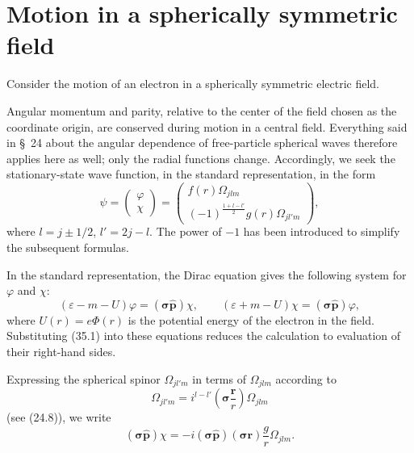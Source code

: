 
\section{Motion in a spherically symmetric field}

Consider the motion of an electron in a spherically symmetric electric field.

Angular momentum and parity, relative to the center of the field chosen as the coordinate origin, are conserved during motion in a central field. Everything said in \S~24 about the angular dependence of free-particle spherical waves therefore applies here as well; only the radial functions change. Accordingly, we seek the stationary-state wave function, in the standard representation, in the form
\begin{equation}
\psi=\begin{pmatrix}\varphi\\ \chi\end{pmatrix}
=\begin{pmatrix}
f(r)\Omega_{jlm}\\
(-1)^{\frac{1+l-l'}2}g(r)\Omega_{jl'm}
\end{pmatrix},
\tag{35.1}
\end{equation}
where $l=j\pm1/2$, $l'=2j-l$. The power of $-1$ has been introduced to simplify the subsequent formulas.

In the standard representation, the Dirac equation gives the following system for $\varphi$ and $\chi$:
\begin{equation}
(\varepsilon-m-U)\varphi=(\boldsymbol\sigma\widehat{\mathbf p})\chi,
\qquad
(\varepsilon+m-U)\chi=(\boldsymbol\sigma\widehat{\mathbf p})\varphi,
\tag{35.2}
\end{equation}
where $U(r)=e\Phi(r)$ is the potential energy of the electron in the field. Substituting (35.1) into these equations reduces the calculation to evaluation of their right-hand sides.

Expressing the spherical spinor $\Omega_{jl'm}$ in terms of $\Omega_{jlm}$ according to
\[
\Omega_{jl'm}=i^{l-l'}\left(\boldsymbol\sigma\frac{\mathbf r}{r}\right)\Omega_{jlm}
\]
(see (24.8)), we write
\[
(\boldsymbol\sigma\widehat{\mathbf p})\chi
=-i(\boldsymbol\sigma\widehat{\mathbf p})(\boldsymbol\sigma\mathbf r)
\frac gr\Omega_{jlm}.
\]

